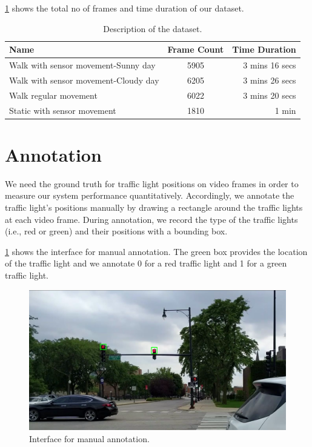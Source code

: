 \ref{t:dataset} shows the total no of frames and time duration of our dataset.

\begin{table}[h!]
  \centering
  \caption{Description of the dataset.}
  \label{t:dataset}
  \begin{tabular}{  l  c  r  }   
    Name & Frame Count & Time Duration \\
    \hline
    Walk with sensor movement-Sunny day & 5905 & 3 mins 16 secs  \\
    Walk with sensor movement-Cloudy day & 6205 & 3 mins 26 secs \\
    Walk regular movement & 6022 & 3 mins 20 secs \\
    Static with sensor movement & 1810 & 1 min \\
    \hline
  \end{tabular}
\end{table}

\section{Annotation}
We need the ground truth for traffic light positions on video frames in order to measure our system performance quantitatively.
Accordingly, we annotate the traffic light's positions manually by drawing a rectangle around the traffic lights at each video frame.
During annotation, we record the type of the traffic lights (i.e., red or green) and their positions with a bounding box.

\ref{f:annotate} shows the interface for manual annotation.
The green box provides the location of the traffic light and we annotate 0 for a red traffic light and 1 for a green traffic light.

\begin{figure}[h!]
\centering
\includegraphics[width=5.2in]{images/annotation.png}
\caption{Interface for manual annotation.}
\label{f:annotate}
\end{figure}


